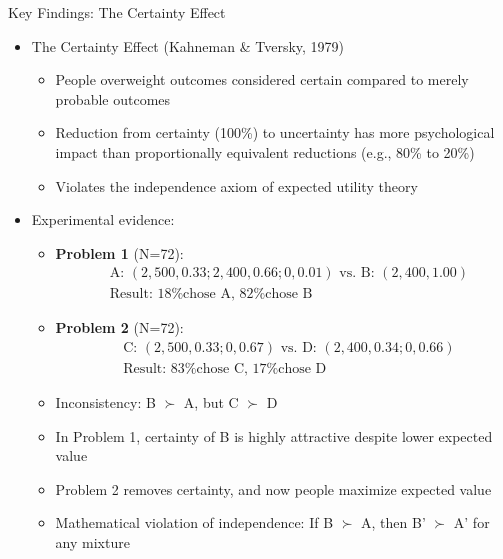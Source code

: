 \documentclass[10pt]{beamer}
\begin{document}
\begin{frame}{Key Findings: The Certainty Effect}
  \begin{itemize}[<+->]
    \item The Certainty Effect (Kahneman \& Tversky, 1979)
      \begin{itemize}
        \item People overweight outcomes considered certain compared to merely probable outcomes
        \item Reduction from certainty (100\%) to uncertainty has more psychological impact than proportionally equivalent reductions (e.g., 80\% to 20\%)
        \item Violates the independence axiom of expected utility theory
      \end{itemize}
    \item Experimental evidence:
      \begin{itemize}
        \item \textbf{Problem 1} (N=72):
          \begin{align*}
            &\text{A: } (2,500, 0.33; 2,400, 0.66; 0, 0.01) \text{ vs. B: } (2,400, 1.00)\\
            &\text{Result: 18\% chose A, 82\% chose B}
          \end{align*}
        \item \textbf{Problem 2} (N=72):
          \begin{align*}
            &\text{C: } (2,500, 0.33; 0, 0.67) \text{ vs. D: } (2,400, 0.34; 0, 0.66)\\
            &\text{Result: 83\% chose C, 17\% chose D}
          \end{align*}
        \item Inconsistency: B $\succ$ A, but C $\succ$ D
        \item In Problem 1, certainty of B is highly attractive despite lower expected value
        \item Problem 2 removes certainty, and now people maximize expected value
        \item Mathematical violation of independence: If B $\succ$ A, then B' $\succ$ A' for any mixture
      \end{itemize}
  \end{itemize}
\end{frame}
\end{document}
